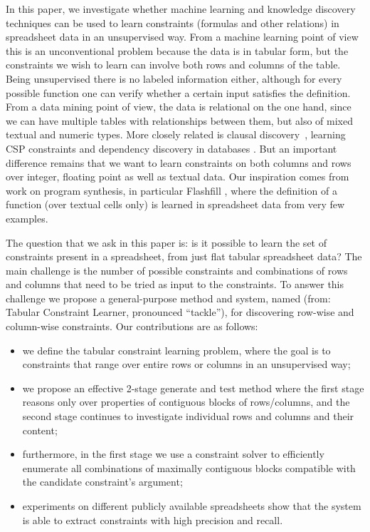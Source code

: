 In this paper,  we investigate whether machine learning and knowledge discovery techniques can be used to learn constraints (formulas and other relations) in spreadsheet data in an unsupervised way.
From a machine learning point of view this is an unconventional problem because the data is in tabular form, but the constraints we wish to learn can involve both rows and columns of the table. Being unsupervised there is no labeled information either, although for every possible function one can verify whether a certain input satisfies the definition.
From a data mining point of view, the data is relational on the one hand, since we can have multiple tables with relationships between them, but also of mixed textual and numeric types. More closely related is clausal discovery~\cite{claudien,lallouet}, learning CSP constraints \cite{Quacq,Conacq,modelseeker} and dependency discovery in databases \cite{savnik}. But an important difference remains that we want to learn constraints on both columns and rows over integer, floating point as well as textual data.
Our inspiration comes from work on program synthesis, in particular Flashfill \cite{flashfill}, where the definition of a function (over textual cells only) is learned in spreadsheet data from very few examples.


The question that we ask in this paper is: is it possible to learn the set of constraints present in a spreadsheet, from just flat tabular spreadsheet data? The main challenge is the number of possible constraints and combinations of rows and columns that need to be tried as input to the constraints.
To answer this challenge we propose a general-purpose method and system, named \sname (from: Tabular Constraint Learner, pronounced ``tackle''), for discovering row-wise and column-wise constraints.
%
Our contributions are as follows:
\begin{itemize}
\item we define the tabular constraint learning problem, where the goal is to constraints that range over entire rows or columns in an unsupervised way;
\item we propose an effective 2-stage generate and test method where the first stage reasons only over properties of contiguous blocks of rows/columns, and the second stage continues to investigate individual rows and columns and their content;
\item furthermore, in the first stage we use a constraint solver to efficiently enumerate all combinations of maximally contiguous blocks compatible with the candidate constraint's argument; %
\item experiments on different publicly available spreadsheets show that the system is able to extract constraints with high precision and recall. 
\end{itemize}

